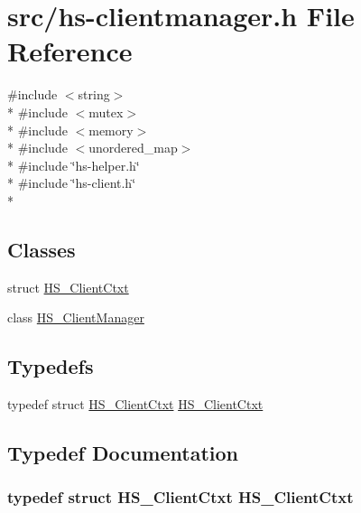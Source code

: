 \hypertarget{hs-clientmanager_8h}{}\section{src/hs-\/clientmanager.h File Reference}
\label{hs-clientmanager_8h}
{\ttfamily \#include $<$string$>$}\\*
{\ttfamily \#include $<$mutex$>$}\\*
{\ttfamily \#include $<$memory$>$}\\*
{\ttfamily \#include $<$unordered\+\_\+map$>$}\\*
{\ttfamily \#include \char`\"{}hs-\/helper.\+h\char`\"{}}\\*
{\ttfamily \#include \char`\"{}hs-\/client.\+h\char`\"{}}\\*
\subsection*{Classes}
\begin{DoxyCompactItemize}
\item 
struct \hyperlink{struct_h_s___client_ctxt}{H\+S\+\_\+\+Client\+Ctxt}
\item 
class \hyperlink{class_h_s___client_manager}{H\+S\+\_\+\+Client\+Manager}
\end{DoxyCompactItemize}
\subsection*{Typedefs}
\begin{DoxyCompactItemize}
\item 
typedef struct \hyperlink{struct_h_s___client_ctxt}{H\+S\+\_\+\+Client\+Ctxt} \hyperlink{hs-clientmanager_8h_a58a145d17337b835ab3fe17b50163040}{H\+S\+\_\+\+Client\+Ctxt}
\end{DoxyCompactItemize}


\subsection{Typedef Documentation}
\subsubsection[{\texorpdfstring{H\+S\+\_\+\+Client\+Ctxt}{HS_ClientCtxt}}]{\setlength{\rightskip}{0pt plus 5cm}typedef struct {\bf H\+S\+\_\+\+Client\+Ctxt}  {\bf H\+S\+\_\+\+Client\+Ctxt}}\hypertarget{hs-clientmanager_8h_a58a145d17337b835ab3fe17b50163040}{}\label{hs-clientmanager_8h_a58a145d17337b835ab3fe17b50163040}
